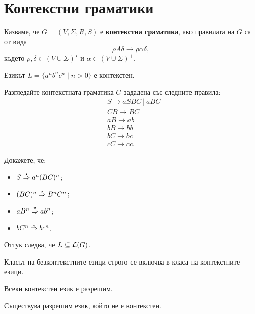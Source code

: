 \section{Контекстни граматики}
Казваме, че $G = (V,\Sigma,R,S)$ е {\bf контекстна граматика}, ако правилата на $G$ са от вида
\[\rho A \delta \to \rho \alpha \delta,\]
където $\rho,\delta \in (V\cup\Sigma)^\star$ и $\alpha \in (V\cup\Sigma)^+$.

\begin{example}
  Езикът $L = \{a^nb^nc^n \mid n > 0\}$ е контекстен.
\end{example}
\begin{hint}
  Разгледайте контекстната граматика $G$ зададена със следните правила:
  \begin{align*}
    & S \to aSBC\ |\ aBC\\
    & CB \to BC\\
    & aB \to ab\\
    & bB \to bb\\
    & bC \to bc\\
    & cC \to cc.
  \end{align*}

  Докажете, че:
  \begin{itemize}
  \item
    $S \stackrel{{\star}}{\Rightarrow} a^n(BC)^n$;
  \item
    $(BC)^n \stackrel{{\star}}{\Rightarrow} B^nC^n$;
  \item
    $aB^n \stackrel{{\star}}{\Rightarrow} ab^n$;
  \item
    $bC^n \stackrel{{\star}}{\Rightarrow} bc^n$.
  \end{itemize}
  Оттук следва, че $L \subseteq \mathcal{L}(G)$.
\end{hint}

\begin{proposition}
  Класът на безконтекстните езици строго се включва в класа на контекстните езици.
\end{proposition}

\begin{proposition}
  Всеки контекстен език е разрешим.
\end{proposition}

\begin{proposition}
  Съществува разрешим език, който не е контекстен.
\end{proposition}


